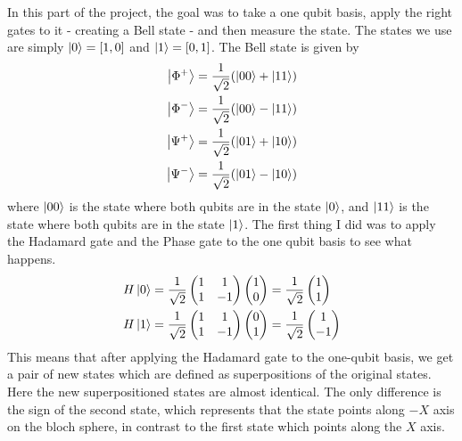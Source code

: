 \documentclass[11pt, letterpaper, titlepage]{article}
\begin{document}
In this part of the project, the goal was to take a one qubit basis, apply the right gates to it - creating a Bell state - and then measure the state. The states we use are simply \(\ket{0} = [1,0]\) and \(\ket{1} = [0,1]\). The Bell state is given by
\[
\begin{aligned}
        \ket{\Phi^+} &= \frac{1}{\sqrt{2}}(\ket{00} + \ket{11})\\
        \ket{\Phi^-} &= \frac{1}{\sqrt{2}}(\ket{00} - \ket{11})\\
        \ket{\Psi^+} &= \frac{1}{\sqrt{2}}(\ket{01} + \ket{10})\\
        \ket{\Psi^-} &= \frac{1}{\sqrt{2}}(\ket{01} - \ket{10})
\end{aligned}
\]
where $\ket{00}$ is the state where both qubits are in the state $\ket{0}$, and $\ket{11}$ is the state where both qubits are in the state $\ket{1}$. \newline
The first thing I did was to apply the Hadamard gate and the Phase gate to the one qubit basis to see what happens. 
\[
\begin{aligned}
H \ket{0} &= \frac{1}{\sqrt{2}}\begin{pmatrix}
        1&1\\1&-1
\end{pmatrix}
\begin{pmatrix}
  1\\0
\end{pmatrix} = \frac{1}{\sqrt{2}} \begin{pmatrix}
        1\\1
\end{pmatrix}\\
H \ket{1} &= \frac{1}{\sqrt{2}}\begin{pmatrix}
        1&1\\1&-1
\end{pmatrix}
\begin{pmatrix}
        0\\1
\end{pmatrix} = \frac{1}{\sqrt{2}}\begin{pmatrix}
        1\\-1
\end{pmatrix}\\
\end{aligned}
\] 
This means that after applying the Hadamard gate to the one-qubit basis, we get a pair of new states which are defined as superpositions of the original states. Here the new superpositioned states are almost identical. The only difference is the sign of the second state, which represents that the state points along \(-X\) axis on the bloch sphere, in contrast to the first state which points along the \(X\) axis. \newline
\end{document}
